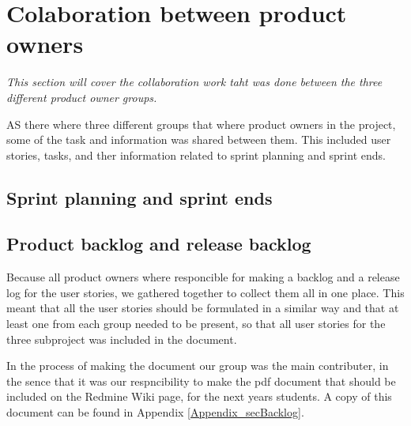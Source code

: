 \section{Colaboration between product owners}
\textit{This section will cover the collaboration work taht was done between the three different product owner groups.}

AS there where three different groups that where product owners in the project, some of the task and information was shared between them. This included user stories, tasks, and ther information related to sprint planning and sprint ends.

\subsection{Sprint planning and sprint ends}


\subsection{Product backlog and release backlog}
Because all product owners where responcible for making a backlog and a release log for the user stories, we gathered together to collect them all in one place. This meant that all the user stories should be formulated in a similar way and that at least one from each group needed to be present, so that all user stories for the three subproject was included in the document.

In the process of making the document our group was the main contributer, in the sence that it was our respncibility to make the pdf document that should be included on the Redmine Wiki page, for the next years students. A copy of this document can be found in Appendix \ref{Appendix_secBacklog}.
